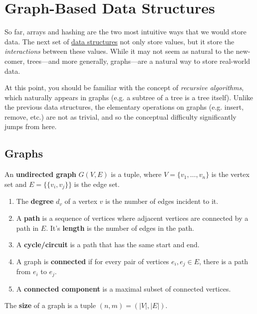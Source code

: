 \section{Graph-Based Data Structures} 

  So far, arrays and hashing are the two most intuitive ways that we would store data. The next set of \hyperref[def:data-structure]{data structures} not only store values, but it store the \textit{interactions} between these values. While it may not seem as natural to the new-comer, trees---and more generally, graphs---are a natural way to store real-world data. 

  At this point, you should be familiar with the concept of \textit{recursive algorithms}, which naturally appears in graphs (e.g. a subtree of a tree is a tree itself). Unlike the previous data structures, the elementary operations on graphs (e.g. insert, remove, etc.) are not as trivial, and so the conceptual difficulty significantly jumps from here.  

\subsection{Graphs}

  \begin{definition}
    \label{def:undirected-graphs}
    An \textbf{undirected graph} $G(V, E)$ is a tuple, where $V = \{v_1, \ldots, v_n\}$ is the vertex set and $E = \{\{v_i, v_j\}\}$ is the edge set. 
    \begin{enumerate}
      \item The \textbf{degree} $d_v$ of a vertex $v$ is the number of edges incident to it. 
      \item A \textbf{path} is a sequence of vertices where adjacent vertices are connected by a path in $E$. It's \textbf{length} is the number of edges in the path. 
      \item A \textbf{cycle/circuit} is a path that has the same start and end. 
      \item A graph is \textbf{connected} if for every pair of vertices $e_i, e_j \in E$, there is a path from $e_i$ to $e_j$. 
      \item A \textbf{connected component} is a maximal subset of connected vertices. 
    \end{enumerate}
    The \textbf{size} of a graph is a tuple $(n, m) = (|V|, |E|)$. 
  \end{definition}

